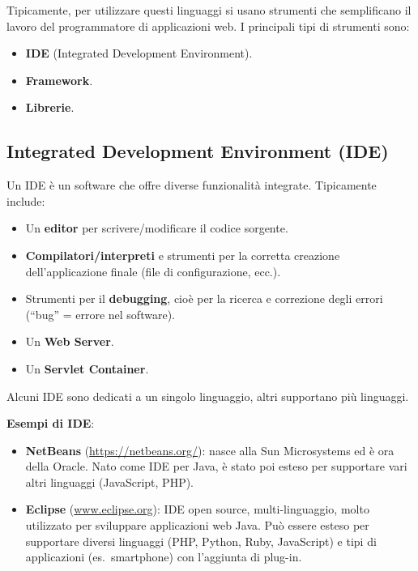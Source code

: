 Tipicamente, per utilizzare questi linguaggi si usano strumenti che semplificano il lavoro del programmatore di applicazioni web. I principali tipi di strumenti sono:

\begin{itemize}
    \item \textbf{IDE} (Integrated Development Environment).
    \item \textbf{Framework}.
    \item \textbf{Librerie}.
\end{itemize}

\subsection{Integrated Development Environment (IDE)}

Un IDE è un software che offre diverse funzionalità integrate. Tipicamente include:

\begin{itemize}
    \item Un \textbf{editor} per scrivere/modificare il codice sorgente.
    \item \textbf{Compilatori/interpreti} e strumenti per la corretta creazione dell'applicazione finale (file di configurazione, ecc.).
    \item Strumenti per il \textbf{debugging}, cioè per la ricerca e correzione degli errori (``bug'' = errore nel software).
    \item Un \textbf{Web Server}.
    \item Un \textbf{Servlet Container}.
\end{itemize}

Alcuni IDE sono dedicati a un singolo linguaggio, altri supportano più linguaggi.

\textbf{Esempi di IDE}:

\begin{itemize}
    \item \textbf{NetBeans} (\url{https://netbeans.org/}): nasce alla Sun Microsystems ed è ora della Oracle. Nato come IDE per Java, è stato poi esteso per supportare vari altri linguaggi (JavaScript, PHP).
    \item \textbf{Eclipse} (\url{www.eclipse.org}): IDE open source, multi-linguaggio, molto utilizzato per sviluppare applicazioni web Java. Può essere esteso per supportare diversi linguaggi (PHP, Python, Ruby, JavaScript) e tipi di applicazioni (es.\ smartphone) con l'aggiunta di plug-in.
\end{itemize}

